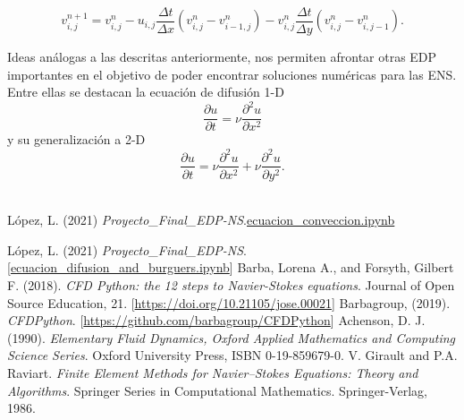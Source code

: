 \documentclass[A4,10pt]{article}
\begin{document}
\begin{multicols}{2}
$$v_{i,j}^{n+1} = v_{i,j}^n - u_{i,j} \frac{\Delta t}{\Delta x} (v_{i,j}^n-v_{i-1,j}^n) - v_{i,j}^n \frac{\Delta t}{\Delta y} (v_{i,j}^n-v_{i,j-1}^n).$$

Ideas análogas a las descritas anteriormente, nos permiten afrontar otras EDP importantes en el objetivo de poder encontrar soluciones numéricas para las ENS. Entre ellas se destacan la ecuación de difusión 1-D 
$$\frac{\partial u}{\partial t}= \nu \frac{\partial^2 u}{\partial x^2}$$
y su generalización a 2-D
$$\frac{\partial u}{\partial t} = \nu \frac{\partial ^2 u}{\partial x^2} + \nu \frac{\partial ^2 u}{\partial y^2}.$$
\\

\end{multicols}
\begin{thebibliography}{99}
 López, L. (2021) \textit{Proyecto\_Final\_EDP-NS}.\href{https://github.com/LeonardoLopez2218061/Proyecto_Final_EDP-NS/blob/main/Desarrollo_Jupyter/ecuacion_conveccion.ipynb}{ecuacion\_conveccion.ipynb}

 López, L. (2021) \textit{Proyecto\_Final\_EDP-NS}. [\href{https://github.com/LeonardoLopez2218061/Proyecto_Final_EDP-NS/blob/main/Desarrollo_Jupyter/ecuacion_difusion_and_burguers.ipynb}{ecuacion\_difusion\_and\_burguers.ipynb}]
	 Barba, Lorena A., and Forsyth, Gilbert F. (2018). \textit{CFD Python: the 12 steps to Navier-Stokes equations}. Journal of Open Source Education, 21. [\href{https://doi.org/10.21105/jose.00021}{https://doi.org/10.21105/jose.00021}]
 Barbagroup, (2019). \textit{CFDPython}. [\href{https://github.com/barbagroup/CFDPython}{https://github.com/barbagroup/CFDPython}]
 Achenson, D. J. (1990). \textit{Elementary Fluid Dynamics, Oxford Applied Mathematics and Computing Science Series}. Oxford University Press, ISBN 0-19-859679-0.
 V. Girault and P.A. Raviart. \textit{Finite Element Methods for Navier–Stokes Equations: Theory and Algorithms}. Springer Series in Computational Mathematics. Springer-Verlag, 1986.
\end{thebibliography}
\end{document}
